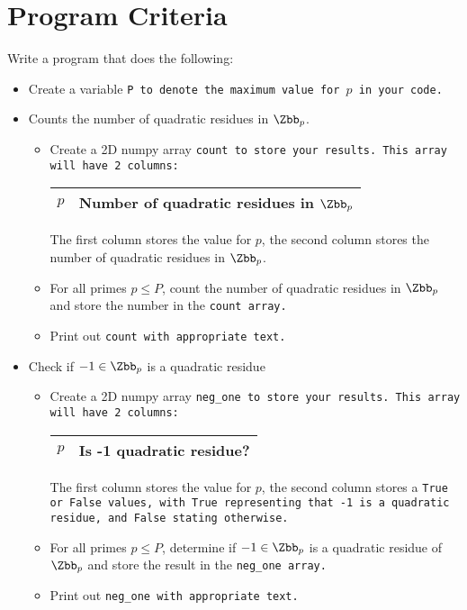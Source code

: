 \documentclass{article}
\begin{document}
\section*{Program Criteria}
	Write a program that does the following:
	\begin{itemize}
		\item Create a variable \tt{P} to denote the maximum value for $p$ in your code.
		\item Counts the number of quadratic residues in $\Zbb_p$.
		\begin{itemize}
			\item Create a 2D numpy array \tt{count} to store your results.  This array will have 2 columns:
			\begin{center}
				\begin{tabular}{|c|c|}
				\hline
					$p$ & Number of quadratic residues in $\Zbb_p$	 \\
				\hline
				\end{tabular}
	
			\end{center}
			The first column stores the value for $p$, the second column stores the number of quadratic residues in $\Zbb_p$.	
			\item For all primes $p \leq P$, count the number of quadratic residues in $\Zbb_p$ and store the number in the \tt{count} array.
			\item Print out \tt{count} with appropriate text.
				\end{itemize}
			
			\item Check if $-1 \in \Zbb_p$ is a quadratic residue
			\begin{itemize}
				\item Create a 2D numpy array \tt{neg\_one} to store your results.  This array will have 2 columns:
				\begin{center}
				\begin{tabular}{|c|c|}
				\hline
					$p$ & Is -1 quadratic residue?	 \\
				\hline
				\end{tabular}
				
			\end{center}
			The first column stores the value for $p$, the second column stores a \tt{True} or \tt{False} values, with \tt{True} representing that -1 is a quadratic residue, and \tt{False} stating otherwise.
			\item For all primes $p \leq P$, determine if $-1 \in \Zbb_p$ is a quadratic residue of $\Zbb_p$ and store the result in the \tt{neg\_one} array.
			\item Print out \tt{neg\_one} with appropriate text.
			\end{itemize}
	\end{itemize}
\end{document}
